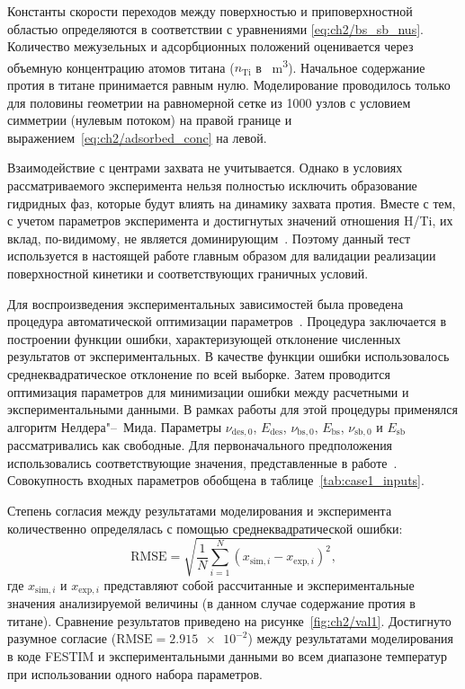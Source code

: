 Константы скорости переходов между поверхностью и приповерхностной областью определяются в соответствии с уравнениями \cref{eq:ch2/bs_sb_nus}. Количество межузельных и адсорбционных положений оценивается через объемную концентрацию атомов титана ($n_\mathrm{Ti}$ в \si{\per\meter\cubed}). Начальное содержание протия в титане принимается равным нулю. Моделирование проводилось только для половины геометрии на равномерной сетке из 1000 узлов с условием симметрии (нулевым потоком) на правой границе и выражением~\cref{eq:ch2/adsorbed_conc} на левой.

Взаимодействие с центрами захвата не учитывается. Однако в условиях рассматриваемого эксперимента нельзя полностью исключить образование гидридных фаз, которые будут влиять на динамику захвата протия. Вместе с тем, с учетом параметров эксперимента и достигнутых значений отношения H/Ti, их вклад, по-видимому, не является доминирующим~\cite{Wang1996}. Поэтому данный тест используется в настоящей работе главным образом для валидации реализации поверхностной кинетики и соответствующих граничных условий.

Для воспроизведения экспериментальных зависимостей была проведена процедура автоматической оптимизации параметров~\cite{Delaporte-Mathurin2021}. Процедура заключается в построении функции ошибки, характеризующей отклонение численных результатов от экспериментальных. В качестве функции ошибки использовалось среднеквадратическое отклонение по всей выборке. Затем проводится оптимизация параметров для минимизации ошибки между расчетными и экспериментальными данными. В рамках работы для этой процедуры применялся алгоритм Нелдера"--~Мида. Параметры $\nu_\mathrm{des,0}$, $E_\mathrm{des}$, $\nu_\mathrm{bs,0}$, $E_\mathrm{bs}$, $\nu_\mathrm{sb,0}$ и $E_\mathrm{sb}$ рассматривались как свободные. Для первоначального предположения использовались соответствующие значения, представленные в работе~\cite{Shimohata2021}. Совокупность входных параметров обобщена в таблице~\cref{tab:case1_inputs}.

Степень согласия между результатами моделирования и эксперимента количественно определялась с помощью среднеквадратической ошибки:
\begin{equation}
    \mathrm{RMSE} = \sqrt{\dfrac{1}{N} \sum \limits_{i=1}^N(x_{\mathrm{sim},i}-x_{\mathrm{exp},i})^2},
\end{equation}
где $x_{\mathrm{sim},i}$ и $x_{\mathrm{exp},i}$ представляют собой рассчитанные и экспериментальные значения анализируемой величины (в данном случае содержание протия в титане).
Сравнение результатов приведено на рисунке~\cref{fig:ch2/val1}. Достигнуто разумное согласие (\( \mathrm{RMSE}=\num{2.915e-2} \)) между результатами моделирования в коде FESTIM и экспериментальными данными во всем диапазоне температур при использовании одного набора параметров.

